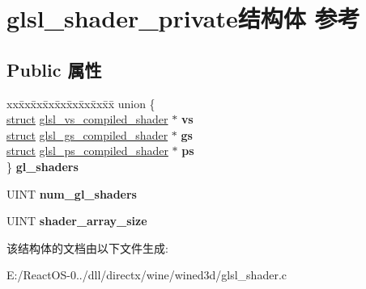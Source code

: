\hypertarget{structglsl__shader__private}{}\section{glsl\+\_\+shader\+\_\+private结构体 参考}
\label{structglsl__shader__private}
\subsection*{Public 属性}
\begin{DoxyCompactItemize}
\item 
\mbox{\label{structglsl__shader__private_ac7f7232bc7b83f2ecc6d95e4741ff60a}} 
\begin{tabbing}
xx\=xx\=xx\=xx\=xx\=xx\=xx\=xx\=xx\=\kill
union \{\\
\>\hyperlink{interfacestruct}{struct} \hyperlink{structglsl__vs__compiled__shader}{glsl\_vs\_compiled\_shader} $\ast$ {\bfseries vs}\\
\>\hyperlink{interfacestruct}{struct} \hyperlink{structglsl__gs__compiled__shader}{glsl\_gs\_compiled\_shader} $\ast$ {\bfseries gs}\\
\>\hyperlink{interfacestruct}{struct} \hyperlink{structglsl__ps__compiled__shader}{glsl\_ps\_compiled\_shader} $\ast$ {\bfseries ps}\\
\} {\bfseries gl\_shaders}\\

\end{tabbing}\item 
\mbox{\label{structglsl__shader__private_a69d6d2c9063e4b4a31e10d3628cb6ec0}} 
U\+I\+NT {\bfseries num\+\_\+gl\+\_\+shaders}
\item 
\mbox{\label{structglsl__shader__private_a231dafc4d1caa45c661a8c79b7debef2}} 
U\+I\+NT {\bfseries shader\+\_\+array\+\_\+size}
\end{DoxyCompactItemize}


该结构体的文档由以下文件生成\+:\begin{DoxyCompactItemize}
\item 
E\+:/\+React\+O\+S-\/0../dll/directx/wine/wined3d/glsl\+\_\+shader.\+c\end{DoxyCompactItemize}
